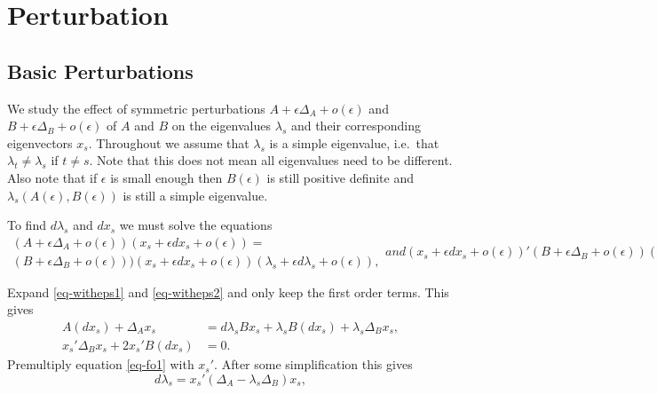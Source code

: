 \documentclass[
  12pt,
  letterpaper,
  DIV=11,
  numbers=noendperiod]{scrartcl}
\newcommand{\sectionbreak}{\clearpage}
\begin{document}
\sectionbreak

\section{Perturbation}\label{sec-perturb}

\subsection{Basic Perturbations}\label{sec-basic}

We study the effect of symmetric perturbations
\(A+\epsilon\Delta_A+o(\epsilon)\) and
\(B+\epsilon\Delta_B+o(\epsilon)\) of \(A\) and \(B\) on the eigenvalues
\(\lambda_s\) and their corresponding eigenvectors \(x_s\). Throughout
we assume that \(\lambda_s\) is a simple eigenvalue, i.e.~that
\(\lambda_t\not=\lambda_s\) if \(t\not=s\). Note that this does not mean
all eigenvalues need to be different. Also note that if \(\epsilon\) is
small enough then \(B(\epsilon)\) is still positive definite and
\(\lambda_s(A(\epsilon),B(\epsilon))\) is still a simple eigenvalue.

To find \(d\lambda_s\) and \(dx_s\) we must solve the equations
\begin{subequations}
\begin{multline}
(A+\epsilon\Delta_A+o(\epsilon))(x_s+\epsilon dx_s+o(\epsilon))=\\(B+\epsilon\Delta_B+o(\epsilon)))(x_s+\epsilon dx_s+o(\epsilon))(\lambda_s+\epsilon d\lambda_s+o(\epsilon)),\label{eq-witheps1}
\end{multline}
and
\begin{equation}
(x_s+\epsilon dx_s+o(\epsilon))'(B+\epsilon\Delta_B+o(\epsilon))(x_s+\epsilon dx_s+o(\epsilon))=1.\label{eq-witheps2}
\end{equation}
\end{subequations}

Expand \eqref{eq-witheps1} and \eqref{eq-witheps2} and only keep the
first order terms. This gives \begin{subequations}
\begin{align}
A(dx_s)+\Delta_Ax_s&=d\lambda_sBx_s+\lambda_sB(dx_s)+\lambda_s\Delta_Bx_s,\label{eq-fo1}\\
x_s'\Delta_Bx_s+2x_s'B(dx_s)&=0.\label{eq-fo2}
\end{align}
\end{subequations} Premultiply equation \eqref{eq-fo1} with \(x_s'\).
After some simplification this gives \begin{equation}
d\lambda_s=x_s'(\Delta_A-\lambda_s\Delta_B)x_s,\label{eq-def1}
\end{equation}
\end{document}
